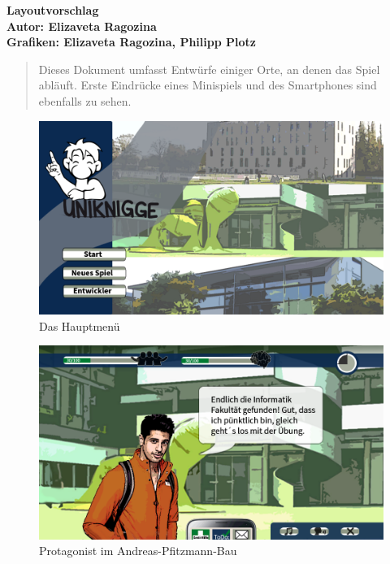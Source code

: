 \documentclass[a4paper,10pt]{article}
\begin{document}
\vspace*{1cm}

{\bfseries \large Layoutvorschlag \\[1mm]
\normalfont Autor: Elizaveta Ragozina\\					%
\normalfont Grafiken: Elizaveta Ragozina, Philipp Plotz}
\vspace{1cm}

\begin{abstract}
	Dieses Dokument umfasst Entwürfe einiger Orte, an denen das Spiel abläuft. Erste Eindrücke eines Minispiels und des Smartphones sind ebenfalls zu sehen.
\end{abstract}

\newpage

\begin{figure}
	\centering
	\includegraphics[width=\textwidth]{../layout/layout_mainmenu.png}
	\caption{Das Hauptmenü}
\end{figure}

\begin{figure}
	\centering
	\includegraphics[width=\textwidth]{../layout/layout_apb.png}
	\caption{Protagonist im Andreas-Pfitzmann-Bau}
\end{figure}
\end{document}
